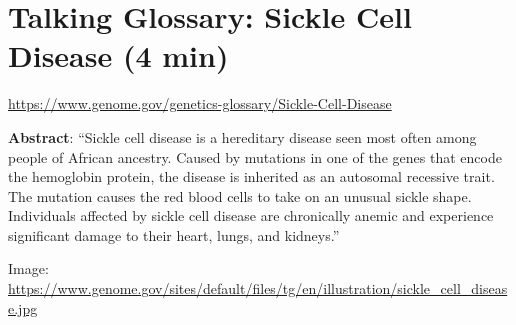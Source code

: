 \documentclass[
]{book}
\begin{document}
\hypertarget{talking-glossary-sickle-cell-disease-4-min}{%
\section{Talking Glossary: Sickle Cell Disease (4 min)}\label{talking-glossary-sickle-cell-disease-4-min}}

\url{https://www.genome.gov/genetics-glossary/Sickle-Cell-Disease}

\textbf{Abstract}: ``Sickle cell disease is a hereditary disease seen most often among people of African ancestry. Caused by mutations in one of the genes that encode the hemoglobin protein, the disease is inherited as an autosomal recessive trait. The mutation causes the red blood cells to take on an unusual sickle shape. Individuals affected by sickle cell disease are chronically anemic and experience significant damage to their heart, lungs, and kidneys.''

Image: \url{https://www.genome.gov/sites/default/files/tg/en/illustration/sickle_cell_disease.jpg}
\end{document}
